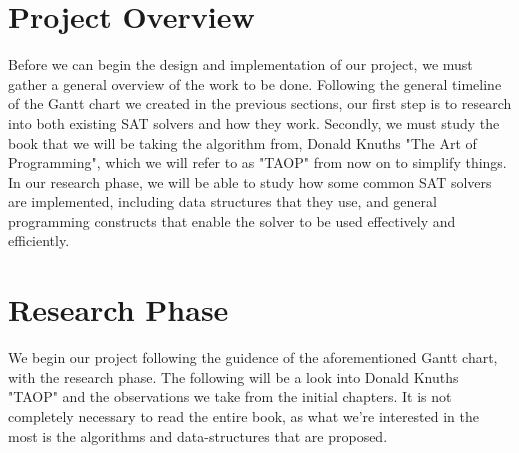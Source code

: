 \documentclass{article}
\begin{document}

\section{Project Overview}
Before we can begin the design and implementation of our project, we must gather a general overview of the work to be done. Following the general timeline
of the Gantt chart we created in the previous sections, our first step is to research into both existing SAT solvers and how they work. Secondly, we must
study the book that we will be taking the algorithm from, Donald Knuths "The Art of Programming", which we will refer to as "TAOP" from now on to simplify
things. In our research phase, we will be able to study how some common SAT solvers are implemented, including data structures that they use, and general
programming constructs that enable the solver to be used effectively and efficiently.

\newpage
\section{Research Phase}
We begin our project following the guidence of the aforementioned Gantt chart, with the research phase. The following will be a look into
Donald Knuths "TAOP" and the observations we take from the initial chapters. It is not completely necessary to read the entire book, as
what we're interested in the most is the algorithms and data-structures that are proposed.
\end{document}
